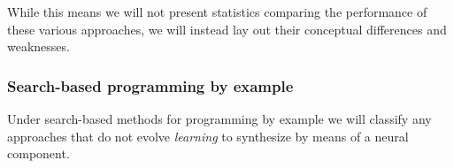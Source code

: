 \documentclass{article}
\begin{document}


While this means we will not present statistics
comparing the performance of these various approaches,
we will instead lay out their conceptual differences and weaknesses.

\subsubsection{Search-based programming by example}

Under search-based methods for programming by example we will classify any approaches that do not evolve \emph{learning} to synthesize by means of a neural component.
\end{document}
